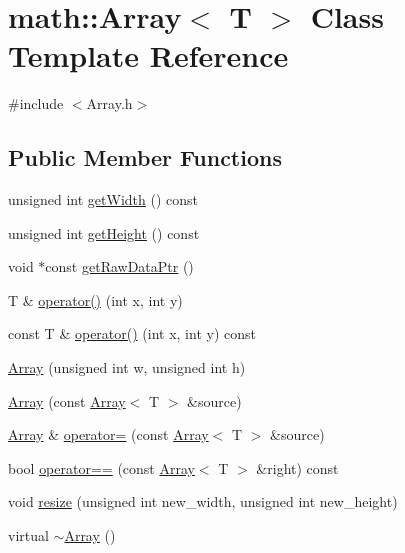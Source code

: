 \hypertarget{classmath_1_1_array}{}\section{math\+:\+:Array$<$ T $>$ Class Template Reference}
\label{classmath_1_1_array}


{\ttfamily \#include $<$Array.\+h$>$}

\subsection*{Public Member Functions}
\begin{DoxyCompactItemize}
\item 
unsigned int \hyperlink{classmath_1_1_array_aed1d255a072e2026f8fc7cb037d0697b}{get\+Width} () const
\item 
unsigned int \hyperlink{classmath_1_1_array_a2ebce27bf14e2c7ea83b5004e1a83bc5}{get\+Height} () const
\item 
void $\ast$const \hyperlink{classmath_1_1_array_ab2a61b31ce041823cc17220033b1fe1a}{get\+Raw\+Data\+Ptr} ()
\item 
T \& \hyperlink{classmath_1_1_array_a27f8eda2c4250a127826d697ebfb43ed}{operator()} (int x, int y)
\item 
const T \& \hyperlink{classmath_1_1_array_a24d7818828f26077fd029e48a87acc31}{operator()} (int x, int y) const
\item 
\hyperlink{classmath_1_1_array_abd2edb231282b3b43fcc3c7a91a59ca4}{Array} (unsigned int w, unsigned int h)
\item 
\hyperlink{classmath_1_1_array_ac90e20c0774ab33f14e23e8f59117223}{Array} (const \hyperlink{classmath_1_1_array}{Array}$<$ T $>$ \&source)
\item 
\hyperlink{classmath_1_1_array}{Array} \& \hyperlink{classmath_1_1_array_a5b164d8a39d58bfee90b6f878f3ae007}{operator=} (const \hyperlink{classmath_1_1_array}{Array}$<$ T $>$ \&source)
\item 
bool \hyperlink{classmath_1_1_array_a78beecb014ee77b0dff47dbbb946c704}{operator==} (const \hyperlink{classmath_1_1_array}{Array}$<$ T $>$ \&right) const
\item 
void \hyperlink{classmath_1_1_array_a0a4294917127f526f4a98c460acd7918}{resize} (unsigned int new\+\_\+width, unsigned int new\+\_\+height)
\item 
virtual \hyperlink{classmath_1_1_array_a68c3eb186d34387d63908b78937d7aee}{$\sim$\+Array} ()
\end{DoxyCompactItemize}
